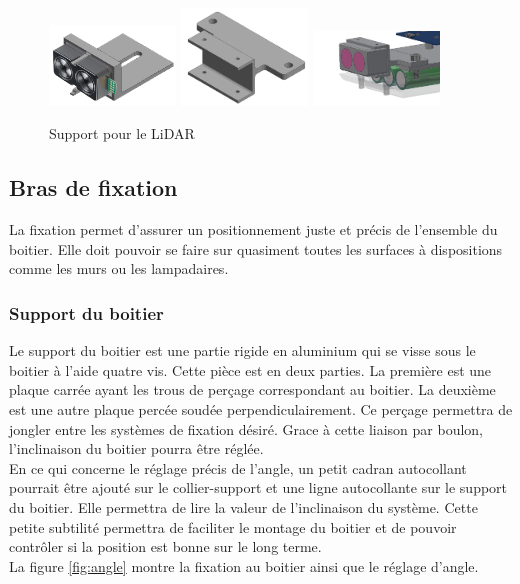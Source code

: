 \begin{figure}[H]
    \centering
    \includegraphics[width=0.3\textwidth]{Images/photos_PGA/lidar dans support.png}
    \includegraphics[width=0.3\textwidth]{Images/photos_PGA/supportLidar2.PNG}
    \includegraphics[width=0.3\textwidth]{Images/photos_PGA/supportlidar.PNG}
    \caption{Support pour le LiDAR}
    \label{fig:supportlidar}
\end{figure}

\subsection{Bras de fixation}

La fixation permet d’assurer un positionnement juste et précis de l’ensemble du boitier. Elle
doit pouvoir se faire sur quasiment toutes les surfaces à dispositions comme les murs ou les 
lampadaires.

\subsubsection{Support du boitier}

Le support du boitier est une partie rigide en aluminium qui se visse sous le boitier à l’aide 
quatre vis. Cette pièce est en deux parties. La première est une plaque carrée ayant les trous de 
perçage correspondant au boitier. La deuxième est une autre plaque percée soudée perpendiculairement.
Ce perçage permettra de jongler entre les systèmes de fixation désiré. Grace à cette liaison par boulon, 
l’inclinaison du boitier pourra être réglée.\\
En ce qui concerne le réglage précis de l’angle, un petit cadran autocollant pourrait être ajouté 
sur le collier-support et une ligne autocollante sur le support du boitier. Elle permettra de lire la valeur 
de l’inclinaison du système. Cette petite subtilité permettra de faciliter le montage du boitier et 
de pouvoir contrôler si la position est bonne sur le long terme.\\
La figure \ref{fig:angle} montre la fixation au boitier ainsi que le réglage d'angle.

